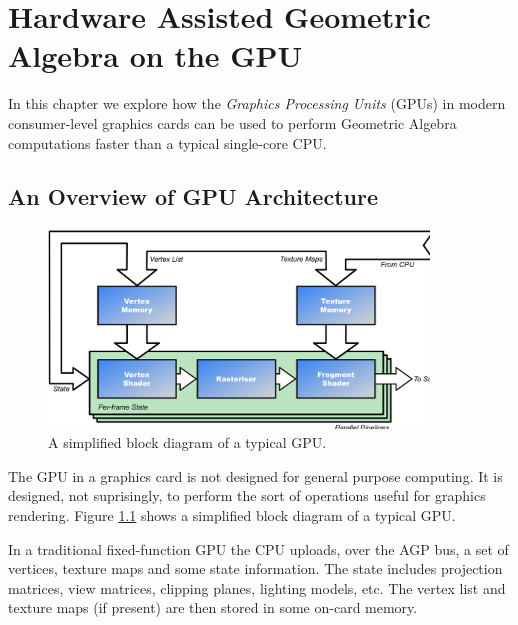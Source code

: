 \begin{savequote}
\end{savequote}

\chapter{Hardware Assisted Geometric Algebra on the GPU}

In this chapter we explore how the \emph{Graphics Processing
Units} (GPUs) in modern consumer-level graphics cards can be
used to perform Geometric Algebra computations faster than a 
typical single-core CPU.

\section{An Overview of GPU Architecture}

\begin{figure}
\centering
\includegraphics[width=0.9\textwidth]{gpu_architecture}
\caption{\label{fig:gpu_architecture}%
  A simplified block diagram of a typical GPU.}
\end{figure}

The GPU in a graphics card is not designed for general purpose 
computing. It is designed, not suprisingly, to perform the
sort of operations useful for graphics rendering. Figure
\ref{fig:gpu_architecture} shows a simplified block diagram of
a typical GPU.

In a traditional fixed-function GPU the CPU uploads, over the AGP
bus, a set of vertices, texture maps and some state information. The
state includes projection matrices, view matrices, clipping planes, 
lighting models, etc. The vertex list and texture maps (if present) 
are then stored in some on-card memory.

